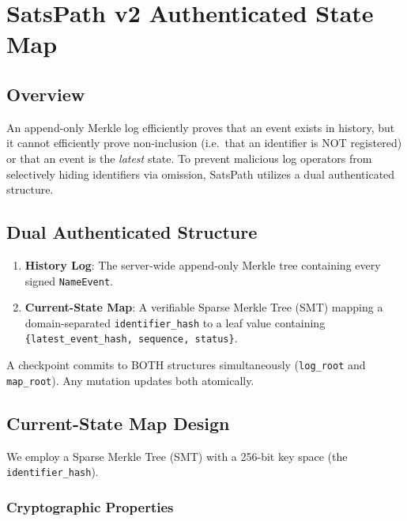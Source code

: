 \documentclass[
]{article}
\author{}
\date{}
\providecommand{\tightlist}{%
  \setlength{\itemsep}{0pt}\setlength{\parskip}{0pt}}
\begin{document}
\hypertarget{satspath-v2-authenticated-state-map}{%
\section{SatsPath v2 Authenticated State
Map}\label{satspath-v2-authenticated-state-map}}

\hypertarget{overview}{%
\subsection{Overview}\label{overview}}

An append-only Merkle log efficiently proves that an event exists in
history, but it cannot efficiently prove non-inclusion (i.e.~that an
identifier is NOT registered) or that an event is the \emph{latest}
state. To prevent malicious log operators from selectively hiding
identifiers via omission, SatsPath utilizes a dual authenticated
structure.

\hypertarget{dual-authenticated-structure}{%
\subsection{Dual Authenticated
Structure}\label{dual-authenticated-structure}}

\begin{enumerate}
\def\labelenumi{\arabic{enumi}.}
\tightlist
\item
  \textbf{History Log}: The server-wide append-only Merkle tree
  containing every signed \texttt{NameEvent}.
\item
  \textbf{Current-State Map}: A verifiable Sparse Merkle Tree (SMT)
  mapping a domain-separated \texttt{identifier\_hash} to a leaf value
  containing \texttt{\{latest\_event\_hash,\ sequence,\ status\}}.
\end{enumerate}

A checkpoint commits to BOTH structures simultaneously
(\texttt{log\_root} and \texttt{map\_root}). Any mutation updates both
atomically.

\hypertarget{current-state-map-design}{%
\subsection{Current-State Map Design}\label{current-state-map-design}}

We employ a Sparse Merkle Tree (SMT) with a 256-bit key space (the
\texttt{identifier\_hash}).

\hypertarget{cryptographic-properties}{%
\subsubsection{Cryptographic
Properties}\label{cryptographic-properties}}
\end{document}
